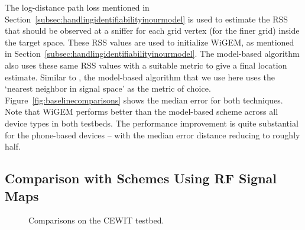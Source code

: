 The log-distance path loss mentioned in Section~\ref{subsec:handlingidentifiabilityinourmodel} is used to estimate the RSS that should be observed at a sniffer for each grid vertex (for the finer grid) inside the target space. These RSS values are used to initialize WiGEM, as mentioned in Section~\ref{subsec:handlingidentifiabilityinourmodel}. The model-based algorithm also uses these same RSS values with a suitable metric to give a final location estimate. Similar to \cite{Bahl00radar:an}, the model-based algorithm that we use here uses the `nearest neighbor in signal space' as the metric of choice. 
Figure~\ref{fig:baselinecomparisons} shows the median error for both techniques. Note that WiGEM performs better than the model-based scheme across all device types in both testbeds. The performance improvement is quite substantial for the phone-based devices -- with the median error distance reducing to roughly half. 

\subsection{Comparison with Schemes Using RF Signal Maps}
\label{subsec:comparisonswithschemesthatuserfsignalmaps}

\begin{figure}[h!] 
	\centering
	\caption{Comparisons on the CEWIT testbed.}
	\label{fig:HR_on_cewittestbed}
\end{figure}

